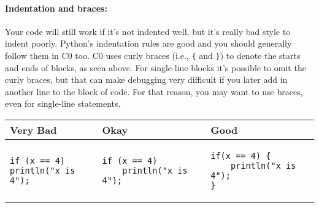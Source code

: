\paragraph{Indentation and braces:}
Your code will still work if it's not indented well, but it's really
bad style to indent poorly.  Python's indentation rules are good and
you should generally follow them in C0 too.  C0 uses curly braces
(i.e., \lstinline'{' and \lstinline'}') to denote the starts and ends
of blocks, as seen above. For single-line blocks it's possible to omit
the curly braces, but that can make debugging very difficult if you
later add in another line to the block of code.  For that reason, you
may want to use braces, even for single-line statements.

\begin{center}
\smalllistings
\begin{tabular}{p{140px}p{140px}p{140px}}
   Very Bad & Okay & Good
\\\hline
\begin{lstlisting}[aboveskip=0pt, belowskip=-4ex]
if (x == 4)
println("x is 4");
\end{lstlisting}
 &
\begin{lstlisting}[aboveskip=0pt, belowskip=-4ex]
if (x == 4)
    println("x is 4");
\end{lstlisting}
 &
\begin{lstlisting}[aboveskip=0pt, belowskip=-4ex]
if(x == 4) {
    println("x is 4");
}
\end{lstlisting}
\end{tabular}
\end{center}
